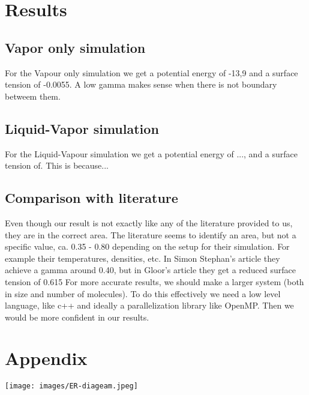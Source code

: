 \documentclass{article}
\begin{document}
\section*{Results}

\subsection*{Vapor only simulation}

For the Vapour only simulation we get a potential energy of -13,9 and a surface tension of -0.0055. A low gamma makes sense when there is not boundary betweem them. 

\subsection*{Liquid-Vapor simulation}

For the Liquid-Vapour simulation we get a potential energy of ..., and a surface tension of. This is because...

\subsection*{Comparison with literature}

Even though our result is not exactly like any of the literature provided to us, they are in the correct area. The literature seems to identify an area, but not a specific value, ca. 0.35 - 0.80 depending on the setup for their simulation. For example their temperatures, densities, etc. In Simon Stephan's \cite{stephan_2018} article they achieve a gamma around 0.40, but in Gloor's \cite{gloor_2005} article they get a reduced surface tension of 0.615 For more accurate results, we should make a larger system (both in size and number of molecules). To do this effectively we need a low level language, like c++ and ideally a parallelization library like OpenMP. Then we would be more confident in our results. 





\section{Appendix}

  \texttt{[image: images/ER-diageam.jpeg]}\\[1cm]
  
\end{document}
